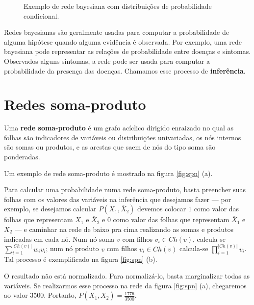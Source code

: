 \begin{figure}
{
  }

  \caption{Exemplo de rede bayesiana com distribuições de probabilidade condicional.}
  \label{fig:bayes}
\end{figure}

Redes bayesianas são geralmente usadas para computar a probabilidade de alguma hipótese quando alguma evidência é observada. Por exemplo, uma rede bayesiana pode representar as relações de probabilidade entre doenças e sintomas. Observados alguns sintomas, a rede pode ser usada para computar a probabilidade da presença das doenças. Chamamos esse processo de \textbf{inferência}.

\section{Redes soma-produto}

Uma \textbf{rede soma-produto} \cite{Poon2012} é um grafo acíclico dirigido enraizado no qual as folhas são indicadores de variáveis ou distribuições univariadas, os nós internos são somas ou produtos, e as arestas que saem de nós do tipo soma são ponderadas.

Um exemplo de rede soma-produto é mostrado na figura \ref{fig:spn} (a).

Para calcular uma probabilidade numa rede soma-produto, basta preencher suas folhas com os valores das variáveis na inferência que desejamos fazer --- por exemplo, se desejamos calcular $P(X_1, \overline X_2)$ devemos colocar $1$ como valor das folhas que representam $X_1$ e $\overline X_2$ e $0$ como valor das folhas que representam $\overline X_1$ e $X_2$ --- e caminhar na rede de baixo pra cima realizando as somas e produtos indicadas em cada nó. Num nó soma $v$ com filhos $v_i \in Ch(v)$, calcula-se $\sum_{i = 1}^{|Ch(v)|} w_i v_i$; num nó produto $v$ com filhos $v_i \in Ch(v)$ calcula-se $\prod_{i = 1}^{|Ch(v)|} v_i$. Tal processo é exemplificado na figura \ref{fig:spn} (b).

O resultado não está normalizado. Para normalizá-lo, basta marginalizar todas as variáveis. Se realizarmos esse processo na rede da figura \ref{fig:spn} (a), chegaremos ao valor 3500. Portanto, $P(X_1, \overline X_2) = \frac{1776}{3500}$.

